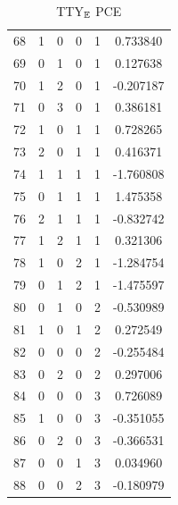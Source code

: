 \documentclass[preprint,12pt]{elsarticle}
\begin{document}
\begin{table}
\begin{minipage}[!h]{0.25\textwidth}
{\begin{tabular}{|c|cccc|c|}
68 &   1 &   0 &   0 &   1 &   0.733840 \\
69 &   0 &   1 &   0 &   1 &   0.127638 \\
70 &   1 &   2 &   0 &   1 &  -0.207187 \\
71 &   0 &   3 &   0 &   1 &   0.386181 \\
72 &   1 &   0 &   1 &   1 &   0.728265 \\
73 &   2 &   0 &   1 &   1 &   0.416371 \\
74 &   1 &   1 &   1 &   1 &  -1.760808 \\
75 &   0 &   1 &   1 &   1 &   1.475358 \\
76 &   2 &   1 &   1 &   1 &  -0.832742 \\
77 &   1 &   2 &   1 &   1 &   0.321306 \\
78 &   1 &   0 &   2 &   1 &  -1.284754 \\
79 &   0 &   1 &   2 &   1 &  -1.475597 \\
80 &   0 &   1 &   0 &   2 &  -0.530989 \\
81 &   1 &   0 &   1 &   2 &   0.272549 \\
82 &   0 &   0 &   0 &   2 &  -0.255484 \\
83 &   0 &   2 &   0 &   2 &   0.297006 \\
84 &   0 &   0 &   0 &   3 &   0.726089 \\
85 &   1 &   0 &   0 &   3 &  -0.351055 \\
86 &   0 &   2 &   0 &   3 &  -0.366531 \\
87 &   0 &   0 &   1 &   3 &   0.034960 \\
88 &   0 &   0 &   2 &   3 &  -0.180979 \\
\hline
\end{tabular}}
\caption{TTY$_{\mathbb{E}}$ PCE}
%
%
\end{minipage}
\end{table}
\end{document}

